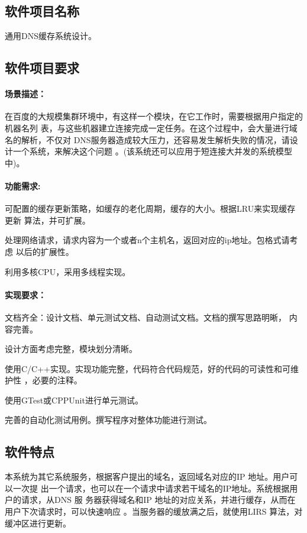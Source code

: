 \documentclass[12pt, a4paper, titlepage]{article}
\begin{document}
\subsection{软件项目名称}
通用DNS缓存系统设计。

\subsection{软件项目要求}
\paragraph{场景描述：\\[7pt]}  

在百度的大规模集群环境中，有这样一个模块，在它工作时，需要根据用户指定的机器名列
表，与这些机器建立连接完成一定任务。在这个过程中，会大量进行域名的解析，不仅对
DNS服务器造成较大压力，还容易发生解析失败的情况，请设计一个系统，来解决这个问题
。(该系统还可以应用于短连接大并发的系统模型中)。

\paragraph{功能需求:}
\begin{asparaenum}
\item{可配置的缓存更新策略，如缓存的老化周期，缓存的大小。根据LRU来实现缓存更新
算法，并可扩展。}
\item{处理网络请求，请求内容为一个或者n个主机名，返回对应的ip地址。包格式请考虑
以后的扩展性。}
\item{利用多核CPU，采用多线程实现。}
\end{asparaenum}
\paragraph{实现要求：}
\begin{asparaenum}
\item{文档齐全：设计文档、单元测试文档、自动测试文档。文档的撰写思路明晰，
内容完善。}
\item{设计方面考虑完整，模块划分清晰。}
\item{使用C/C++实现。实现功能完整，代码符合代码规范，好的代码的可读性和可维护性
，必要的注释。}
\item{使用GTest或CPPUnit进行单元测试。}
\item{完善的自动化测试用例。撰写程序对整体功能进行测试。}
\end{asparaenum}

\subsection{软件特点}
本系统为其它系统服务，根据客户提出的域名，返回域名对应的IP 地址。用户可以一次提
出一个请求，也可以在一个请求中请求若干域名的IP地址。系统根据用户的请求，从DNS 服
务器获得域名和IP 地址的对应关系，并进行缓存，从而在用户下次请求时，可以快速响应
。当服务器的缓放满之后，就使用LIRS 算法，对缓冲区进行更新。
\end{document}
